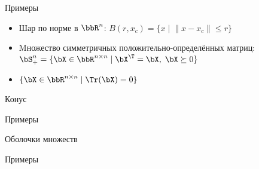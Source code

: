 \documentclass[12pt,russian]{beamer}
\begin{document}
\begin{frame}{Примеры}
\begin{itemize}
\item Шар по норме в $\bbR^n$: $B(r, x_c) = \{ x \; | \; \| x - x_c \| \leq r \}$
\item Mножество симметричных положительно-определённых матриц: $\bS^n_+ = \{ \bX \in \bbR^{n \times n} \; | \; \bX^{\T} = \bX, \; \bX \succeq 0 \}$
\item $\{ \bX \in \bbR^{n \times n} \; | \; \Tr(\bX) = 0 \}$
\end{itemize}
\end{frame}



\begin{frame}{Конус}

\end{frame}

\begin{frame}{Примеры}

\end{frame}

\begin{frame}{Оболочки множеств}

\end{frame}

\begin{frame}{Примеры}

\end{frame}
\end{document}

